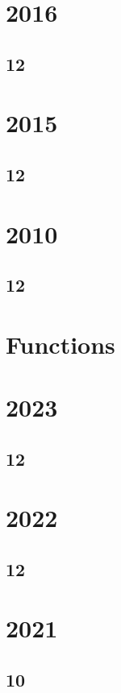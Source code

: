 \section{2016}
\subsection{12}



\section{2015}
\subsection{12}


\section{2010}
\subsection{12}



\section{Functions}
\section{2023}
\subsection{12}

\section{2022}
\subsection{12}

\section{2021}
\subsection{10}

